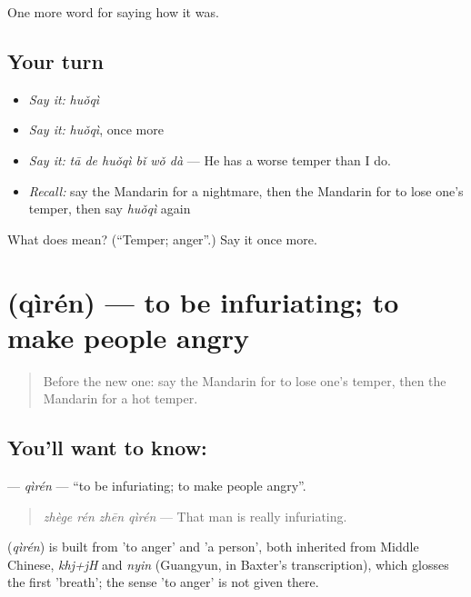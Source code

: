 \begin{grammarlens}[title={What you've built}]
One more word for saying how it was.
\end{grammarlens}

\subsection*{Your turn}
\begin{itemize}
\raggedright
  \item \emph{Say it:} \emph{huǒqì}
  \item \emph{Say it:} \emph{huǒqì}, once more
  \item \emph{Say it:} \emph{tā de huǒqì bǐ wǒ dà} — He has a worse temper than I do.
  \item \emph{Recall:} say the Mandarin for a nightmare, then the Mandarin for to lose one's temper, then say \emph{huǒqì} again
\end{itemize}

\begin{tcolorbox}[breakable,colback=teal!4,colframe=teal!35!black,title={Before you move on}]
What does  mean? (\textquotedblleft{}Temper; anger\textquotedblright{}.) Say it once more.
\end{tcolorbox}
\section[\texorpdfstring{\zh{气人} (qìrén)}{气人 (qìrén)}]{ (qìrén) — to be infuriating; to make people angry}

\label{lesson:ZH-C464-qiren}



\begin{quote}
Before the new one: say the Mandarin for to lose one's temper, then the Mandarin for a hot temper.
\end{quote}

\subsection*{You'll want to know: }
\textbf{} — \emph{qìrén} — \textquotedblleft{}to be infuriating; to make people angry\textquotedblright{}.

\begin{quote}
\textbf{} \emph{zhège rén zhēn qìrén} — That man is really infuriating.
\end{quote}

\begin{cousinweb}
\textbf{} (\emph{qìrén}) is built from  'to anger' and  'a person', both inherited from Middle Chinese, \emph{khj+jH} and \emph{nyin} (Guangyun, in Baxter's transcription), which glosses the first 'breath'; the sense 'to anger' is not given there.
\end{cousinweb}

